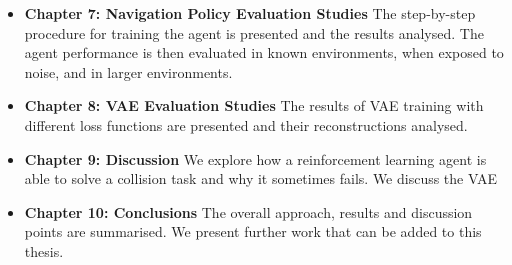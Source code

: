 \begin{itemize}
    \item \textbf{Chapter 7: Navigation Policy Evaluation Studies} 
    The step-by-step procedure for training the agent is presented and the results analysed. The agent performance is then evaluated in known environments, when exposed to noise, and in larger environments.
    \vspace{3mm}
    
    \item \textbf{Chapter 8: VAE Evaluation Studies} 
    The results of VAE training with different loss functions are presented and their reconstructions analysed.
    \vspace{3mm}
    
    \item \textbf{Chapter 9: Discussion}
    We explore how a reinforcement learning agent is able to solve a collision task and why it sometimes fails. We discuss the VAE 
    \vspace{3mm}
    
    \item \textbf{Chapter 10: Conclusions} \vspace{3mm}
    The overall approach, results and discussion points are summarised. We present further work that can be added to this thesis.
    
\end{itemize}





